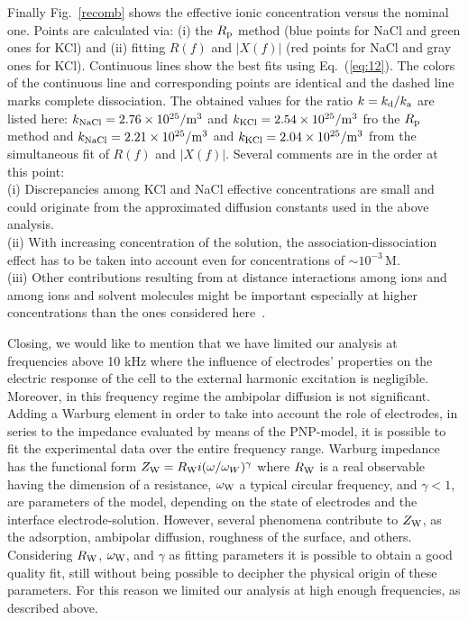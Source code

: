 \documentclass[preprint,aps,pre]{revtex4}
\begin{document}
Finally Fig.~\ref{recomb} shows the effective ionic concentration versus the nominal one. Points are calculated via: (i) the $R_{\rm p}$ method (blue points for NaCl and green ones for KCl) and (ii) fitting $R(f)$ and $\left|X(f)\right|$ (red points for NaCl and gray ones for KCl). Continuous lines show the best fits using Eq.~(\ref{eq:12}). The colors of the continuous line and corresponding points are identical and the dashed line marks complete dissociation. The obtained values for the ratio $k=k_{\rm d}/k_{\rm a}$ are listed here: $k_{\rm NaCl}=2.76\times 10^{25}/\mathrm{m^3}$ and $k_{\rm KCl}=2.54\times 10^{25}/\mathrm{m^3}$ fro the $R_{\rm p}$ method and  $k_{\rm NaCl}=2.21\times 10^{25}/\mathrm{m^3}$ and $k_{\rm KCl}=2.04\times 10^{25}/\mathrm{m^3}$ from the simultaneous fit of $R(f)$ and $\left|X(f)\right|$. Several comments are in the order at this point: \\
(i) Discrepancies among KCl and NaCl effective concentrations are small and could originate from the approximated diffusion constants used in the above analysis. \\
(ii) With increasing concentration of the solution, the association-dissociation effect has to be taken into account even for concentrations of $\sim 10^{-3}\,\mathrm{M}$. \\
(iii) Other contributions resulting from at distance interactions among ions and among ions and solvent molecules might be important especially at higher concentrations than the ones considered here~\cite{H2O,marcus}.

Closing, we would like to mention that we have limited our analysis at frequencies above 10 kHz where the influence of electrodes' properties on the electric response of the cell to the external harmonic excitation is negligible. Moreover, in this frequency regime the ambipolar diffusion is not significant. Adding a Warburg element in order to 
take into account the role of electrodes, in series to the impedance evaluated by means of the 
PNP-model, it is possible to fit the experimental data over the entire 
frequency range. Warburg impedance~\cite{macdo,tribollet} has the functional form 
$Z_{\rm W}=R_{\rm W}\/i(\omega/\omega_W)^\gamma$ where $R_{\rm W}$ is a real observable having the dimension of a resistance, $\omega_{\rm W}$ a typical circular frequency, and $\gamma<1$, are parameters of the model, depending on 
the state of electrodes and the interface electrode-solution. 
However, several phenomena contribute to $Z_{\rm W}$, as the adsorption,
ambipolar diffusion, roughness of the surface, and others. Considering $R_{\rm W}$, $\omega_{\rm W}$, and $\gamma$ as fitting parameters it is possible to obtain a good quality fit, still without being possible to decipher the physical origin of these parameters. For this reason we limited our analysis at high enough frequencies, as described above.
\end{document}
